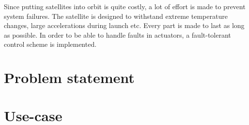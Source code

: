  Since putting satellites into orbit is quite costly, a lot of effort is made to prevent system failures. The satellite is designed to withstand extreme temperature changes, large accelerations during launch etc. Every part is made to last as long as possible. In order to be able to handle faults in actuators, a fault-tolerant control scheme is implemented.
 



\section{Problem statement}


\section{Use-case}\label{sec:useCase}


